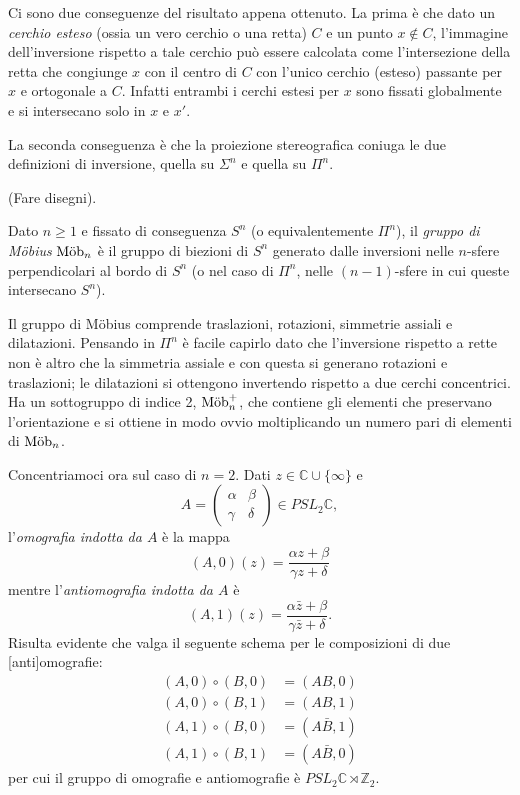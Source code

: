 Ci sono due conseguenze del risultato appena ottenuto. La prima è che dato un \emph{cerchio esteso} (ossia un vero cerchio o una retta) $C$ e un punto $x\not\in C$, l'immagine dell'inversione rispetto a tale cerchio può essere calcolata come l'intersezione della retta che congiunge $x$ con il centro di $C$ con l'unico cerchio (esteso) passante per $x$ e ortogonale a $C$. 
Infatti entrambi i cerchi estesi per $x$ sono fissati globalmente e si intersecano solo in $x$ e $x'$. 

La seconda conseguenza è che la proiezione stereografica coniuga le due definizioni di inversione, quella su $\Sigma^{n}$ e quella su $\Pi^{n}$.

(Fare disegni).

\begin{definizione}
	Dato $n\geq1$ e fissato di conseguenza $S^{n}$ (o equivalentemente $\Pi^{n}$), il \emph{gruppo di Möbius} $\operatorname{M\ddot ob}_{n}$ è il gruppo di biezioni di $S^{n}$ generato dalle inversioni nelle $n$-sfere perpendicolari al bordo di $S^{n}$ (o nel caso di $\Pi^{n}$, nelle $(n-1)$-sfere in cui queste intersecano $S^{n}$).
\end{definizione}

\begin{osservazione}
	Il gruppo di Möbius comprende traslazioni, rotazioni, simmetrie assiali e dilatazioni. Pensando in $\Pi^{n}$ è facile capirlo dato che l'inversione rispetto a rette non è altro che la simmetria assiale e con questa si generano rotazioni e traslazioni; le dilatazioni si ottengono invertendo rispetto a due cerchi concentrici.
	Ha un sottogruppo di indice 2, $\operatorname{M\ddot ob}_{n}^{+}$, che contiene gli elementi che preservano l'orientazione e si ottiene in modo ovvio moltiplicando un numero pari di elementi di $\operatorname{M\ddot ob}_{n}$.
\end{osservazione}

Concentriamoci ora sul caso di $n=2$. 
Dati $z\in\mathbb C\cup\{\infty\}$ e 
$$A=\begin{pmatrix}\alpha & \beta\\\gamma & \delta\end{pmatrix} \in PSL_{2}\mathbb C,$$
l'\emph{omografia indotta da $A$} è la mappa 
$$(A,0)(z) = \frac{\alpha z + \beta}{\gamma z + \delta}$$
mentre l'\emph{antiomografia indotta da $A$} è 
$$(A,1)(z) = \frac{\alpha \bar z + \beta}{\gamma \bar z + \delta}.$$
Risulta evidente che valga il seguente schema per le composizioni di due [anti]omografie:
\begin{align*}
	(A,0)\circ(B,0) &= (AB,0)\\
	(A,0)\circ(B,1) &= (AB,1)\\
	(A,1)\circ(B,0) &= (A\bar B,1)\\
	(A,1)\circ(B,1) &= (A\bar B,0)
\end{align*}
per cui il gruppo di omografie e antiomografie è $PSL_{2}\mathbb C\rtimes \mathbb Z_{2}$.

